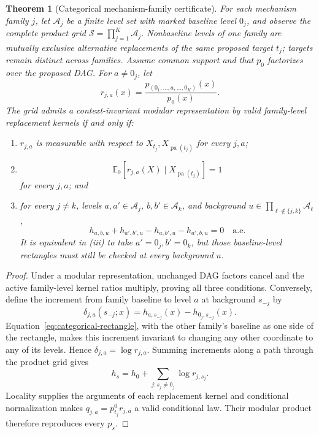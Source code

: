 \documentclass[11pt]{article}
\newtheorem{theorem}{Theorem}[section]
\newcommand{\E}{\mathbb{E}}
\newcommand{\pa}{\operatorname{pa}}
\begin{document}
\begin{theorem}[Categorical mechanism-family certificate]
\label{thm:categorical-certificate}
For each mechanism family \(j\), let \(\mathcal A_j\) be a finite level set
with marked baseline level \(0_j\), and observe the complete product grid
\(\mathcal S=\prod_{j=1}^K\mathcal A_j\).  Nonbaseline levels of one family are
mutually exclusive alternative replacements of the same proposed target
\(t_j\); targets remain distinct across families.  Assume common support and
that \(p_0\) factorizes over the proposed DAG.  For \(a\ne0_j\), let
\begin{equation}
r_{j,a}(x)=\frac{p_{(0_1,\ldots,a,\ldots,0_K)}(x)}{p_0(x)}.
\end{equation}
The grid admits a context-invariant modular representation by valid
family-level replacement kernels if and only if:
\begin{enumerate}[label=(\roman*)]
\item \(r_{j,a}\) is measurable with respect to
\(X_{t_j},X_{\pa(t_j)}\) for every \(j,a\);
\item
\begin{equation}
\E_0[r_{j,a}(X)\mid X_{\pa(t_j)}]=1
\end{equation}
for every \(j,a\); and
\item for every \(j\ne k\), levels \(a,a'\in\mathcal A_j\),
\(b,b'\in\mathcal A_k\), and background
\(u\in\prod_{\ell\notin\{j,k\}}\mathcal A_\ell\),
\begin{equation}
h_{a,b,u}+h_{a',b',u}-h_{a,b',u}-h_{a',b,u}=0
\quad\text{a.e.}
\label{eq:categorical-rectangle}
\end{equation}
It is equivalent in (iii) to take \(a'=0_j,b'=0_k\), but those
baseline-level rectangles must still be checked at every background \(u\).
\end{enumerate}
\end{theorem}

\begin{proof}
Under a modular representation, unchanged DAG factors cancel and the active
family-level kernel ratios multiply, proving all three conditions.  Conversely,
define the increment from family baseline to level \(a\) at background
\(s_{-j}\) by
\begin{equation}
\delta_{j,a}(s_{-j};x)=h_{a,s_{-j}}(x)-h_{0_j,s_{-j}}(x).
\end{equation}
Equation~\eqref{eq:categorical-rectangle}, with the other family's baseline as
one side of the rectangle, makes this increment invariant to changing any
other coordinate to any of its levels.  Hence
\(\delta_{j,a}=\log r_{j,a}\).  Summing increments along a path through the
product grid gives
\begin{equation}
h_s=h_0+\sum_{j:s_j\ne0_j}\log r_{j,s_j}.
\end{equation}
Locality supplies the arguments of each replacement kernel and conditional
normalization makes
\(q_{j,a}=p^0_{t_j}r_{j,a}\) a valid conditional law.  Their modular product
therefore reproduces every \(p_s\).
\end{proof}
\end{document}
